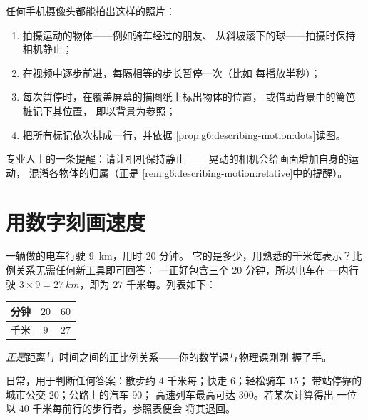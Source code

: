 \begin{method}[制作点迹照片]\label{met:g6:describing-motion:film}
任何手机摄像头都能拍出这样的照片：
\begin{enumerate}
  \item 拍摄运动的物体——例如骑车经过的朋友、
        从斜坡滚下的球——拍摄时保持相机静止；
  \item 在视频中逐步前进，每隔相等的步长暂停一次（比如
        每播放半秒）；
  \item 每次暂停时，在覆盖屏幕的描图纸上标出物体的位置，
        或借助背景中的篱笆桩记下其位置，
        即以背景为参照；
  \item 把所有标记依次排成一行，并依据
        \cref{prop:g6:describing-motion:dots}读图。
\end{enumerate}
专业人士的一条提醒：请让相机保持静止——
晃动的相机会给画面增加自身的运动，
混淆各物体的归属（正是
\cref{rem:g6:describing-motion:relative}中的提醒）。
\end{method}

\section{用数字刻画速度}

\begin{example}[用比例求速度]\label{ex:g6:describing-motion:proportion}
一辆做的电车行驶 \qty{9}{km}，用时 $20$ 分钟。
它的是多少，用熟悉的千米每表示？比例关系无需任何新工具即可回答：
一正好包含三个
$20$ 分钟，所以电车在
一内行驶 $3 \times 9 = \qty{27}{km}$，即为 $27$ 千米每。列表如下：
\begin{center}
\begin{tabular}{l|cc}
分钟 & $20$ & $60$ \\
\hline
千米 & $9$ & $27$
\end{tabular}
\end{center}
\emph{正是}距离与
时间之间的正比例关系——你的数学课与物理课刚刚
握了手。
\end{example}

\begin{example}[速度参照表]\label{ex:g6:describing-motion:paces}
日常，用于判断任何答案：散步约 $4$
千米每；快走 $6$；轻松骑车 $15$；
带站停靠的城市公交 $20$；公路上的汽车 $90$；
高速列车最高可达 $300$。若某次计算得出
一位以 $40$ 千米每前行的步行者，参照表便会
将其退回。
\end{example}

